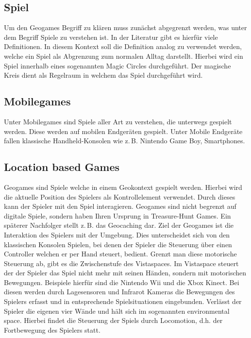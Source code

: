 \subsection*{Spiel}

Um den Geogames Begriff zu klären muss zunächst abgegrenzt werden, was unter dem Begriff Spiele zu verstehen ist. In der Literatur gibt es hierfür viele Definitionen.
In diesem Kontext soll die Definition analog zu \cite{Salen.2010} verwendet werden, welche ein Spiel als Abgrenzung zum normalen Alltag darstellt. Hierbei wird ein Spiel innerhalb eines sogenannten Magic Circles durchgeführt.
Der magische Kreis dient als Regelraum in welchem das Spiel durchgeführt wird.


\subsection*{Mobilegames}

Unter Mobilegames sind Spiele aller Art zu verstehen, die unterwegs gespielt werden. Diese werden auf mobilen Endgeräten gespielt. \cite{Bell.2006} Unter Mobile Endgeräte fallen klassische Handheld-Konsolen wie z.\,B. Nintendo Game Boy, Smartphones.

\subsection*{Location based Games}

Geogames sind Spiele welche in einem Geokontext gespielt werden. Hierbei wird die aktuelle Position des Spielers als Kontrollelement verwendet\citep{Schlieder.2006}. Durch dieses kann der Spieler mit den Spiel interagieren.
Geogames sind nicht begrenzt auf digitale Spiele, sondern haben Ihren Ursprung in Treasure-Hunt Games. Ein späterer Nachfolger stellt z.\,B. das Geocaching dar.
Ziel der Geogames ist die Interaktion des Spielers mit der Umgebung. Dies unterscheidet sich von den klassischen Konsolen Spielen, bei denen der Spieler die Steuerung über einen Controller welchen er per Hand steuert, bedient. Grenzt man diese motorische Steuerung ab, gibt es die Zwischenstufe des Vistaspaces. Im Vistaspace steuert der der Spieler das Spiel nicht mehr mit seinen Händen, sondern mit motorischen Bewegungen. Beispiele hierfür sind die Nintendo Wii und die Xbox Kinect. Bei diesen werden durch Lagesensoren und Infrarot Kameras die Bewegungen des Spielers erfasst und in entsprechende Spielsituationen eingebunden.
Verlässt der Spieler die eigenen vier Wände und hält sich im sogenannten environmental space.
Hierbei findet die Steuerung der Spiels durch Locomotion, d.h. der Fortbewegung des Spielers statt. \cite{Benford.2003,Kiefer.2007}

